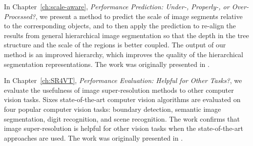 In Chapter~\ref{ch:scale-aware}, \emph{Performance Prediction: Under-, Properly-, or Over-Processed?}, 
we present a method to predict the  scale of image segments relative to the corresponding objects, and to then apply the prediction to re-align the results from general hierarchical image segmentation so that the depth in the tree structure and the scale of the regions is better coupled. The output of our method is an improved hierarchy, which improves the quality of the hierarchical segmentation representations.  The work was originally presented in \citep{Chen2016}. 



In Chapter~\ref{ch:SR4VT}, \emph{Performance Evaluation: Helpful for Other Tasks?}, we evaluate the usefulness of image super-resolution methods to other computer vision tasks. Sixes state-of-the-art computer vision algorithms are evaluated on four popular computer vision tasks: boundary detection, semantic image segmentation, digit recognition, and scene recognition.  The work confirms that image super-resolution is helpful for other vision tasks when the state-of-the-art approaches are used. 
The work was originally presented in \citep{SR4VTs:wacv16}. 


 